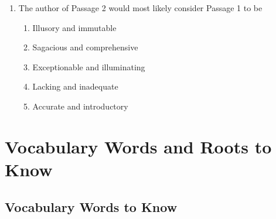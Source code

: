 \documentclass[12pt]{book}
\begin{document}
\begin{enumerate}
\newpage
\item The author of Passage 2 would most likely consider Passage 1 to be
\begin{enumerate}[label=(\Alph*)]
\item Illusory and immutable
\item Sagacious and comprehensive
\item Exceptionable and illuminating
\item Lacking and inadequate
\item Accurate and introductory
\end{enumerate}
\end{enumerate}

\chapter[Vocabulary Words]{Vocabulary Words and Roots to Know}
\section{Vocabulary Words to Know}
\end{document}
